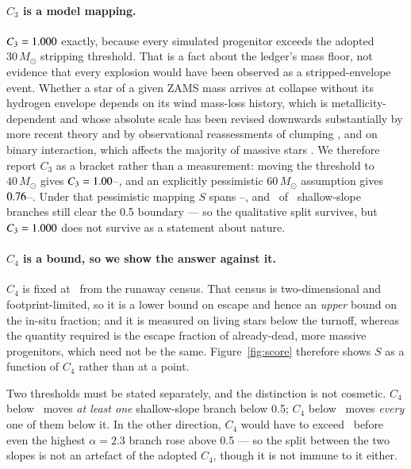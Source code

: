 \documentclass{aa}
\begin{document}
\paragraph{$C_3$ is a model mapping.}
$C_3 = 1.000$ exactly, because every simulated progenitor exceeds the adopted
$30\,M_\odot$ stripping threshold. That is a fact about the ledger's mass floor,
not evidence that every explosion would have been observed as a
stripped-envelope event. Whether a star of a given ZAMS mass arrives at collapse
without its hydrogen envelope depends on its wind mass-loss history, which is
metallicity-dependent \citep{vink2001} and whose absolute scale has been revised
downwards substantially by more recent theory \citep{bjorklund2021} and by
observational reassessments of clumping \citep{smith2014}, and on binary
interaction, which affects the majority of massive stars
\citep{sana2012, demink2014}. We therefore report $C_3$ as a bracket rather than
a measurement: moving the threshold to $40\,M_\odot$ gives
$C_3 = 1.00$--\CthreeFortyHi, and an explicitly pessimistic
$60\,M_\odot$ assumption gives $0.76$--\CthreeSixtyHi. Under that
pessimistic mapping $S$ spans \scorePessLo--\scorePessHi, and
\scorePessTwoAbove\ of \scorePessTwon\ shallow-slope branches still clear the
0.5 boundary --- so the qualitative split survives, but $C_3 = 1.000$ does not
survive as a statement about nature.

\paragraph{$C_4$ is a bound, so we show the answer against it.}
$C_4$ is fixed at \Cfour\ from the runaway census. That census is
two-dimensional and footprint-limited, so it is a lower bound on escape and
hence an \emph{upper} bound on the in-situ fraction; and it is measured on
living stars below the turnoff, whereas the quantity required is the escape
fraction of already-dead, more massive progenitors, which need not be the same.
Figure~\ref{fig:score} therefore shows $S$ as a function of $C_4$ rather than at
a point.

Two thresholds must be stated separately, and the distinction is not cosmetic.
$C_4$ below \CfourAny\ moves \emph{at least one} shallow-slope branch below 0.5;
$C_4$ below \CfourAll\ moves \emph{every} one of them below it. In the other
direction, $C_4$ would have to exceed \CfourLift\ before even the highest
$\alpha = 2.3$ branch rose above 0.5 --- so the split between the two slopes is
not an artefact of the adopted $C_4$, though it is not immune to it either.
\end{document}
